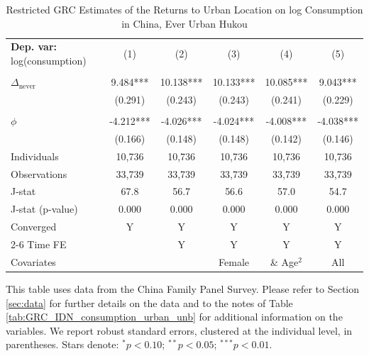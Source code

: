 \begin{table}[htbp] \centering \begin{threeparttable}
 \caption{Restricted GRC Estimates of the Returns to Urban Location on log Consumption in China, Ever Urban Hukou} 
 \label{tab:GRC_CHN_urban_consumption_urban_unb_u} 
\begin{tabular}{l ccccc} \toprule  \textbf{Dep. var:}  log(consumption) 
                    &\multicolumn{1}{c}{(1)}   &\multicolumn{1}{c}{(2)}   &\multicolumn{1}{c}{(3)}   &\multicolumn{1}{c}{(4)}   &\multicolumn{1}{c}{(5)}   \\
                    &               &               &               &               &               \\
\addlinespace
$\Delta_{\text{never}}$&       9.484***&      10.138***&      10.133***&      10.085***&       9.043***\\
                    &     (0.291)   &     (0.243)   &     (0.243)   &     (0.241)   &     (0.229)   \\
                    &               &               &               &               &               \\
\addlinespace
$\phi$              &      -4.212***&      -4.026***&      -4.024***&      -4.008***&      -4.038***\\
                    &     (0.166)   &     (0.148)   &     (0.148)   &     (0.142)   &     (0.146)   \\
\addlinespace
Individuals         &      10,736   &      10,736   &      10,736   &      10,736   &      10,736   \\
Observations        &      33,739   &      33,739   &      33,739   &      33,739   &      33,739   \\
J-stat              &        67.8   &        56.7   &        56.6   &        57.0   &        54.7   \\
J-stat (p-value)    &       0.000   &       0.000   &       0.000   &       0.000   &       0.000   \\
Converged           &           Y   &           Y   &           Y   &           Y   &           Y   \\
\cmidrule{2-6} Time FE & & Y & Y & Y & Y \\ Covariates & & & Female & \& Age$^2$ & All \\ \bottomrule \end{tabular} \begin{tablenotes}[flushleft] \footnotesize \item{This table uses data from the China Family Panel Survey. Please refer to Section \ref{sec:data} for further details on the data and to the notes of Table \ref{tab:GRC_IDN_consumption_urban_unb} for additional information on the variables. We report robust standard errors, clustered at the individual level, in parentheses. Stars denote: $^{*} p<0.10$; $^{**} p<0.05$; $^{***} p<0.01$.} \end{tablenotes} \end{threeparttable} \end{table}
